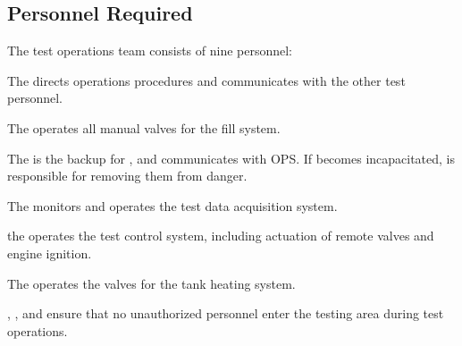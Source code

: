 \subsection{Personnel Required}
The test operations team consists of nine personnel:
\begin{checklist}
    \item The \opsfull{} directs operations procedures and communicates with the other test personnel.
    \item The \primaryfull{} operates all manual valves for the fill system.
    \item The \secondaryfull{} is the backup for \primary{}, and communicates with OPS. If \primary{} becomes incapacitated, \secondary{} is responsible for removing them from danger.
    \item The \daqfull{} monitors and operates the test data acquisition system.
    \item the \controlfull{} operates the test control system, including actuation of remote valves and engine ignition.
    \item The \heatfull{} operates the valves for the tank heating system.
    \item \perifull{}, \periifull{}, and \periiifull{} ensure that no unauthorized personnel enter the testing area during test operations.
\end{checklist}
\setcounter{checklistnum}{0}

